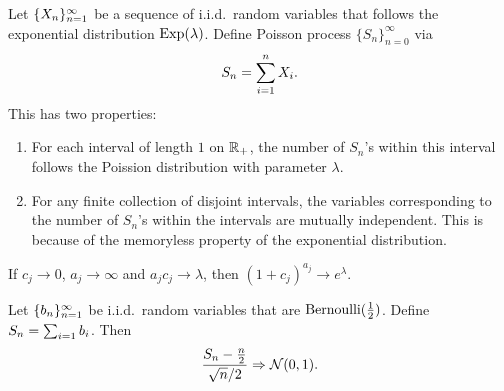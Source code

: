 \documentclass[a4paper]{article}
\newcommand{\convd}{\Rightarrow}
\begin{document}
\begin{eg}
  Let $\{ X_n \}_{n=1}^\infty$ be a sequence of i.i.d.\ 
  random variables that follows the exponential distribution 
  $\operatorname{Exp} (\lambda)$. Define Poisson process $\{S_n\}_{n=0}^\infty$ via 
  \[
  S_n = \sum_{i=1}^n X_i.
  \]
  This has 
  two properties:
  \begin{enumerate}
    \item For each interval of length $1$ on $\mathbb{R}_+$, the number of 
    $S_n$'s within this interval follows the Poission distribution 
    with parameter $\lambda$.

    \item For any finite collection of disjoint intervals, the variables
    corresponding to the number of $S_n$'s within the intervals are 
    mutually independent. This is because of the memoryless property 
    of the exponential distribution.
  \end{enumerate}
\end{eg}

\begin{lemma}
  If $c_j \to 0$, $a_j \to \infty$ and $a_j c_j \to \lambda$, 
  then $(1 + c_j)^{a_j} \to e^{\lambda}$.
\end{lemma}

\begin{thm}
  Let $\{ b_n \}_{n=1}^\infty$ be i.i.d.\ random variables that are 
  $\operatorname{Bernoulli} (\frac{1}{2})$. Define $S_n = \sum_{i=1} b_i$.
  Then 
  \[
  \frac{S_n - \frac{n}{2}}{\sqrt{n} / 2} \convd \ncal (0, 1).
  \]
\end{thm}
\end{document}

